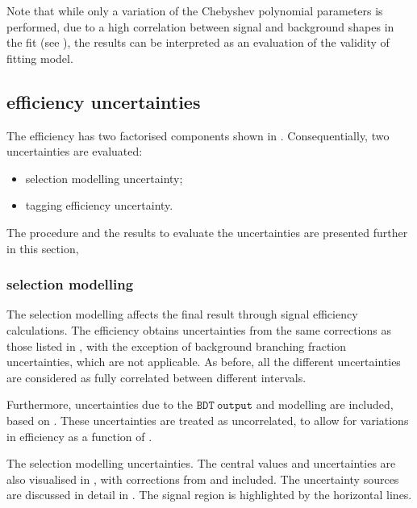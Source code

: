 Note that while only a variation of the Chebyshev polynomial parameters is performed, 
due to a high correlation between signal and background \PDF shapes in the fit (see ),
the results can be interpreted as an evaluation of the validity of fitting model.

\subsection{\texorpdfstring{\BtoXsgamma}{B->Xs gamma} efficiency uncertainties}\label{sec:signal_selection_uncertainties}

The \BtoXsgamma efficiency has two factorised components shown in .
Consequentially, two uncertainties are evaluated:
\begin{itemize}
    \item \BtoXsgamma selection modelling uncertainty;
    \item \BtoXsgamma tagging efficiency uncertainty.
\end{itemize}

The procedure and the results to evaluate the uncertainties are presented further in this section,

\subsubsection{\texorpdfstring{\BtoXsgamma}{B->Xs gamma} selection modelling}

The \BtoXsgamma selection modelling affects the final result through signal efficiency calculations.
The efficiency obtains uncertainties from the same corrections as those listed in , 
with the exception of background branching fraction uncertainties, which are not applicable.
As before, all the different uncertainties are considered as fully correlated between different \EB intervals.

Furthermore, uncertainties due to the $\mathtt{BDT~output}$ and \ZMVA modelling are included, based on .
These uncertainties are treated as uncorrelated, to allow for variations in efficiency as a function of \EB.

\begin{table}[htbp!]
    \centering
    \caption{\label{tab:signal_selection_uncertainties}
    The \BtoXsgamma selection modelling uncertainties.
    The central values and uncertainties are also visualised in ,
    with corrections from  and  included.
    The uncertainty sources are discussed in detail in .
    The signal region is highlighted by the horizontal lines.
    }
    
\end{table}

